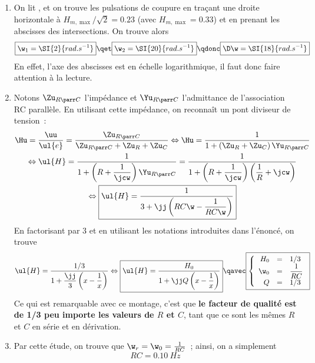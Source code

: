 \documentclass[a4paper, 12pt, final, garamond]{book}
\begin{document}
\begin{enumerate}
    \item On lit , et on trouve les
        pulsations de coupure en traçant une droite horizontale à $H_{m,
        \max}/\sqrt{2} = \num{0.23}$ (avec $H_{m, \max} = \num{0.33}$) et en
        prenant les abscisses des intersections. On trouve alors
        \begin{gather*}
            \boxed{\w_1 = \SI{2}{rad.s^{-1}}}
            \qet
            \boxed{\w_2 = \SI{20}{rad.s^{-1}}}
            \qdonc
            \boxed{\D\w = \SI{18}{rad.s^{-1}}}
        \end{gather*}
        En effet, l'axe des abscisses est en échelle logarithmique, il faut donc
        faire attention à la lecture.
    \item Notons $\Zu_{R\parr C}$ l'impédance et $\Yu_{R\parr C}$ l'admittance
        de l'association RC parallèle. En utilisant cette impédance, on
        reconnaît un pont diviseur de tension~:
        \begin{gather*}
            \Hu
                = \frac{\uu}{\ul{e}}
                = \frac{\Zu_{R\parr C}}{\Zu_{R\parr C} + \Zu_R + \Zu_C}
            \Leftrightarrow
            \Hu = \frac{1}{1 + \left(\Zu_R + \Zu_C\right)\Yu_{R\parr C}}\\
            \Leftrightarrow
            \ul{H}
                = \frac{1}{1 + \left(R + \dfrac{1}{\jcw}\right)\Yu_{R\parr C}}
                = \frac{1}{1 + \left(R + \dfrac{1}{\jcw}\right)\left(
                    \dfrac{1}{R} + \jcw\right)}\\
            \Leftrightarrow
            \boxed{\ul{H} = \frac{1}{3+\jj\left(RC\w - \dfrac{1}{RC\w}\right)}}
        \end{gather*}
        En factorisant par 3 et en utilisant les notations introduites dans
        l'énoncé, on trouve
        \begin{gather*}
            \ul{H}
                = \frac{1/3}{1 + \dfrac{\jj}{3} \left( x - \dfrac{1}{x} \right)}
            \Leftrightarrow
            \boxed{
            \ul{H} = \frac{H_0}{1 + \jj Q \left( x - \dfrac{1}{x} \right)}}
            \qavec
            \boxed{
            \left\{
                \begin{array}{rcl}
                    H_0  & = & 1/3\\
                    \w_0 & = & \dfrac{1}{RC}\\
                    Q    & = & 1/3
                \end{array}
            \right.
            }
        \end{gather*}
        Ce qui est remarquable avec ce montage, c'est que \textbf{le facteur de
        qualité est de 1/3 peu importe les valeurs de $R$ et $C$}, tant que ce
        sont les mêmes $R$ et $C$ en série et en dérivation.
    \item Par cette étude, on trouve que $\w_r = \w_0 = \frac{1}{RC}$~; ainsi,
        on a simplement \[\boxed{RC = \SI{0.10}{Hz}}\]
\end{enumerate}
\end{document}
